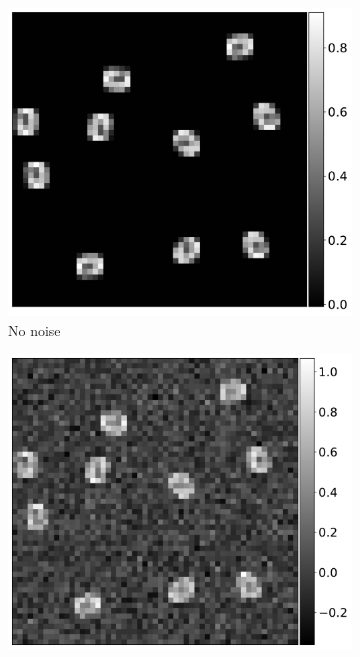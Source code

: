 \documentclass{article}
\begin{document}
\begin{figure}[!tb]
	\begin{subfigure}[ht]{0.30\columnwidth}
		\centering
		\includegraphics[width=\columnwidth]{figures/Micrographs_noise_clean.pdf}
		\caption{No noise}
	\end{subfigure}
	\hfill
	\begin{subfigure}[ht]{0.30\columnwidth}
		\centering
		\includegraphics[width=\columnwidth]{figures/Micrographs_noise_a.pdf}

\end{subfigure}
\end{figure}
\end{document}
